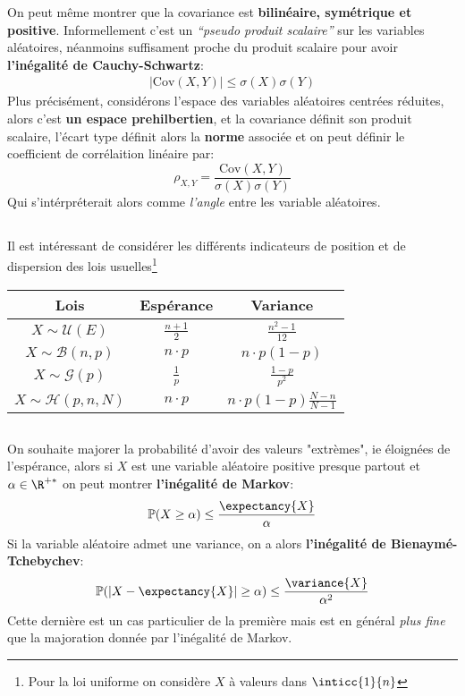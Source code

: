 On peut même montrer que la covariance est \textbf{bilinéaire, symétrique et positive}. Informellement c'est un \textit{``pseudo produit scalaire''} sur les variables aléatoires, néanmoins suffisament proche du produit scalaire pour avoir \textbf{l'inégalité de Cauchy-Schwartz}:
\begin{align*}
   |\text{Cov}(X, Y)| \leq \sigma(X)\sigma(Y)
\end{align*}
Plus précisément, considérons l'espace des variables aléatoires centrées réduites, alors c'est \textbf{un espace prehilbertien}, et la covariance définit son produit scalaire, l'écart type définit alors la \textbf{norme} associée et on peut définir le coefficient de corrélaition linéaire par:
\[
   \rho_{X, Y} = \frac{\text{Cov}(X, Y)}{\sigma(X)\sigma(Y)}
\]
Qui s'intérpréterait alors comme \textit{l'angle} entre les variable aléatoires.
\pagebreak
\subsection*{}
Il est intéressant de considérer les différents indicateurs de position et de dispersion des lois usuelles\footnote[1]{Pour la loi uniforme on considère \(X\) à valeurs dans \(\inticc{1}{n}\)}

\begin{center}
   \renewcommand{\arraystretch}{2}
   \setlength{\tabcolsep}{18pt}
   
   \begin{tabular}{|c||c|c|}
      \hline
      Lois & \cellcolor{BrightBlue1!40} Espérance & \cellcolor{BrightBlue1!40} Variance \\ 
      \hline
      \cellcolor{BrightBlue1!40} \(X \sim \mathcal{U}(E)\) & \(\frac{n+1}{2}\) & \(\frac{n^2 - 1}{12}\) \\ 
      \hline
      \cellcolor{BrightBlue1!40} \(X \sim \mathcal{B}(n, p)\) & \(n\cdot p\) &  \(n\cdot p(1-p)\) \\ 
      \hline
      \cellcolor{BrightBlue1!40} \(X \sim \mathcal{G}(p)\) & \(\frac{1}{p}\) & \(\frac{1-p}{p^2}\) \\ 
      \hline
      \cellcolor{BrightBlue1!40} \(X \sim \mathcal{H}(p, n, N)\) & \(n\cdot p\) & \(n\cdot p(1-p)\frac{N - n}{N - 1}\) \\ 
      \hline
   \end{tabular}
\end{center}

\subsection*{}
On souhaite majorer la probabilité d'avoir des valeurs "extrèmes", ie éloignées de l'espérance, alors si \(X\) est une variable aléatoire positive presque partout et \(\alpha \in \R^{+*}\) on peut montrer \textbf{l'inégalité de Markov}:
\[
   \mathbb{P}(X \geq \alpha) \leq \frac{\expectancy{X}}{\alpha}
\]
Si la variable aléatoire admet une variance, on a alors \textbf{l'inégalité de Bienaymé-Tchebychev}:
\[
   \mathbb{P}(|X - \expectancy{X}| \geq \alpha) \leq \frac{\variance{X}}{\alpha^2}
\]
Cette dernière est un cas particulier de la première mais est en général \textit{plus fine} que la majoration donnée par l'inégalité de Markov.
